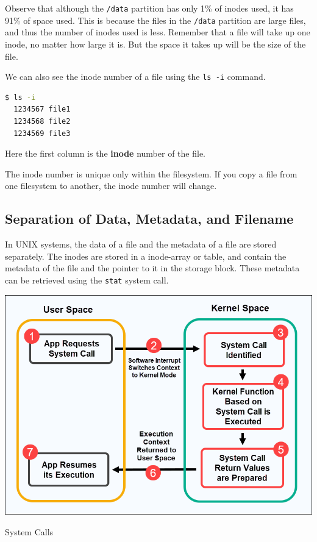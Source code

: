 Observe that although the \texttt{/data} partition has only 1\% of inodes used, it has 91\% of space used.
This is because the files in the \texttt{/data} partition are large files, and thus the number of inodes used is less.
Remember that a file will take up one inode, no matter how large it is.
But the space it takes up will be the size of the file.

We can also see the inode number of a file using the \texttt{ls -i} command.

\begin{lstlisting}[language=bash]
$ ls -i
  1234567 file1
  1234568 file2
  1234569 file3
\end{lstlisting}

Here the first column is the \textbf{inode} number of the file.

\begin{remark}
  The inode number is unique only within the filesystem.
  If you copy a file from one filesystem to another, the inode number will change.
\end{remark}

\subsection{Separation of Data, Metadata, and Filename}

In UNIX systems, the data of a file and the metadata of a file are stored separately.
The inodes are stored in a inode-array or table, and contain the metadata of the file and the pointer to it in the storage block.
These metadata can be retrieved using the \texttt{stat} system call.

\begin{marginfigure}
  \includegraphics{images/png/syscall.png}
  \caption[System Calls]{System Calls}
\end{marginfigure}

